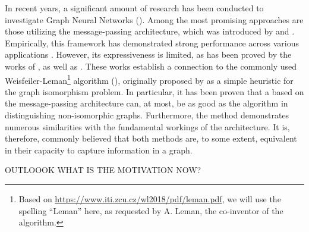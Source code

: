 In recent years, a significant amount of research has been conducted to investigate \textsf{Graph Neural Networks} (\gnns). Among the most promising approaches are those utilizing the message-passing architecture, which was introduced by \cite{Sca+2009} and \cite{Gil+2017}. 
Empirically, this framework has demonstrated strong performance across various applications \cite{Kip+2017, Ham+2017, Xu2018}. However, its expressiveness is limited, as has been proved by the works of \cite{Morris2018}, as well as \cite{Xu2018}. These works establish a connection to the commonly used Weisfeiler-Leman\footnote{Based on \href{https://www.iti.zcu.cz/wl2018/pdf/leman.pdf}{https://www.iti.zcu.cz/wl2018/pdf/leman.pdf}, we will use the spelling ``Leman'' here, as requested by A. Leman, the co-inventor of the algorithm.} algorithm (\wl), originally proposed by \cite{Wei+1968} as a simple heuristic for the graph isomorphism problem. In particular, it has been proven that a \gnn based on the message-passing architecture can, at most, be as good as the \wl algorithm in distinguishing non-isomorphic graphs. Furthermore, the \wl method demonstrates numerous similarities with the fundamental workings of the \gnn architecture. It is, therefore, commonly believed that both methods are, to some extent, equivalent in their capacity to capture information in a graph.

OUTLOOOK WHAT IS THE MOTIVATION NOW?

